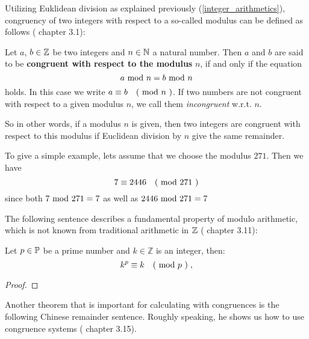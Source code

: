 Utilizing Euklidean division as explained previously (\ref{integer_arithmetics}), congruency of two integers with respect to a so-called modulus can be defined as follows
(\cite{JB} chapter 3.1):
\begin{definition} [congruency] Let $ a $, $ b \in \mathbb{Z} $ be two integers and $ n \in \mathbb{N} $ a natural number.
Then $ a $ and $ b $ are said to be \textbf{congruent with respect to the modulus} $ n $, if and only if the equation
\begin{equation}
a \text{ mod } n = b \text{ mod } n
\end{equation}
holds. In this case we write
$ a \equiv b \quad \text{( mod } n \text{ )} $. If two numbers are not congruent with respect to a given modulus $n$, we call them \textit{incongruent} w.r.t. $n$.
\end{definition}
So in other words, if a modulus $n$ is given, then two integers are congruent with respect to this modulus if Euclidean division by $n$ give the same remainder.   
\begin{example}To give a simple example, lets assume that we choose the modulus $271$. Then we have
$$ 7 \equiv 2446 \quad \text{( mod } 271 \text{ )} $$
since both $7 \text{ mod } 271 = 7$ as well as $2446 \text{ mod } 271=7$
\end{example}
The following sentence describes a fundamental property of modulo arithmetic, which is not known from traditional arithmetic in $ \mathbb{Z} $ (\cite{JB} chapter 3.11):
\begin{theorem}  Let $ p \in \mathbb{P} $ be a prime number
and $ k \in \mathbb{Z} $ is an integer, then:
\begin{equation}
k ^ p \equiv k \quad \text{( mod } p \text{ )} \;,
\end{equation}
\end{theorem}
\begin{proof} 
\end{proof}


Another theorem that is important for calculating with congruences is the following Chinese remainder sentence. Roughly speaking, he shows us how to use congruence systems (\cite{JB} chapter 3.15).

